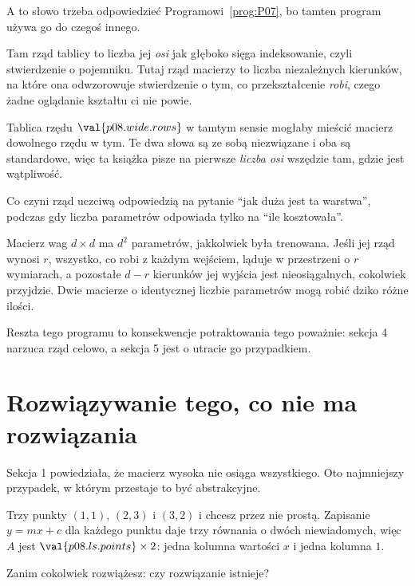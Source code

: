 
\begin{fr}
\begin{note}
A to słowo trzeba odpowiedzieć Programowi~\ref{prog:P07}, bo tamten program
używa go do czegoś innego.

Tam rząd tablicy to liczba jej \emph{osi} \dash{} jak głęboko sięga
indeksowanie, czyli stwierdzenie o pojemniku. Tutaj rząd macierzy to liczba
niezależnych kierunków, na które ona odwzorowuje \dash{} stwierdzenie o tym, co
przekształcenie \emph{robi}, czego żadne oglądanie kształtu ci nie powie.

Tablica rzędu $\val{p08.wide.rows}$ w tamtym sensie mogłaby mieścić macierz
dowolnego rzędu w tym. Te dwa słowa są ze sobą niezwiązane i oba są
standardowe, więc ta książka pisze na pierwsze \emph{liczba osi} wszędzie tam,
gdzie jest wątpliwość.
\end{note}
\end{fr}

\begin{fr}
\begin{aibox}
Co czyni rząd uczciwą odpowiedzią na pytanie \enquote{jak duża jest ta
warstwa}, podczas gdy liczba parametrów odpowiada tylko na \enquote{ile
kosztowała}.

Macierz wag $d \times d$ ma $d^{2}$ parametrów, jakkolwiek była trenowana.
Jeśli jej rząd wynosi $r$, wszystko, co robi z każdym wejściem, ląduje w
przestrzeni o $r$ wymiarach, a pozostałe $d - r$ kierunków jej wyjścia jest
nieosiągalnych, cokolwiek przyjdzie. Dwie macierze o identycznej liczbie
parametrów mogą robić dziko różne ilości.

Reszta tego programu to konsekwencje potraktowania tego poważnie: sekcja 4
narzuca rząd celowo, a sekcja 5 jest o utracie go przypadkiem.
\end{aibox}
\end{fr}

\section{Rozwiązywanie tego, co nie ma rozwiązania}
\label{sec:P08-least-squares}

\begin{fr}
Sekcja 1 powiedziała, że macierz wysoka nie osiąga wszystkiego. Oto najmniejszy
przypadek, w którym przestaje to być abstrakcyjne.

Trzy punkty \dash{} $(1, 1)$, $(2, 3)$ i $(3, 2)$ \dash{} i chcesz przez nie
prostą. Zapisanie $y = mx + c$ dla każdego punktu daje trzy równania o dwóch
niewiadomych, więc $A$ jest
$\val{p08.ls.points} \times 2$: jedna kolumna wartości $x$ i jedna kolumna
$1$.

Zanim cokolwiek rozwiążesz: czy rozwiązanie istnieje?
\dotline
\nextframe
\end{fr}

